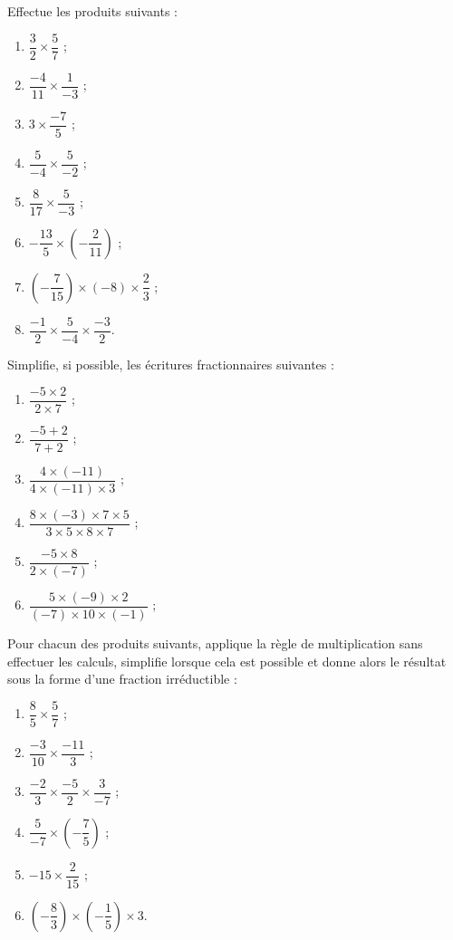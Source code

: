 \begin{exercice}
Effectue les produits suivants :
\begin{enumerate}
\item $\dfrac{3}{2} \times \dfrac{5}{7}$ ;
\item $\dfrac{-4}{11} \times \dfrac{1}{-3}$ ;
\item $3 \times \dfrac{-7}{5}$ ;
\item $\dfrac{5}{-4} \times \dfrac{5}{-2}$ ;
\item $\dfrac{8}{17} \times \dfrac{5}{-3}$ ;
\item $-\dfrac{13}{5} \times \left(-\dfrac{2}{11}\right)$ ;
\item $\left(-\dfrac{7}{15}\right) \times (-8) \times \dfrac{2}{3}$ ;
\item $\dfrac{-1}{2} \times \dfrac{5}{-4} \times \dfrac{-3}{2}$.
\end{enumerate}
\end{exercice}




\newpage
\begin{exercice}
Simplifie, si possible, les écritures fractionnaires suivantes :
\begin{enumerate}
\item $\dfrac{-5 \times 2}{2 \times 7}$ ;  
\item $\dfrac{-5 + 2}{7 + 2}$ ;
\item $\dfrac{4 \times (-11)}{4 \times (-11) \times 3}$ ;
\item $\dfrac{8 \times (-3) \times 7 \times 5}{3 \times 5 \times 8 \times 7}$ ;
\item $\dfrac{-5 \times 8}{2 \times (-7)}$ ;
\item $\dfrac{5 \times (-9) \times 2}{(-7) \times 10 \times (-1)}$ ;
\end{enumerate}
\end{exercice}





\begin{exercice}
Pour chacun des produits suivants, applique la règle de multiplication sans effectuer les calculs, simplifie lorsque cela est possible et donne alors le résultat sous la forme d'une fraction irréductible :
\begin{enumerate}
\item $\dfrac{8}{5} \times \dfrac{5}{7}$ ;
\item $\dfrac{-3}{10} \times \dfrac{-11}{3}$ ;
\item $\dfrac{-2}{3} \times \dfrac{-5}{2} \times \dfrac{3}{-7}$ ;
\item $\dfrac{5}{-7} \times \left(-\dfrac{7}{5}\right)$ ;
\item $-15 \times \dfrac{2}{15}$ ;
\item $\left(-\dfrac{8}{3}\right) \times \left(-\dfrac{1}{5}\right) \times 3$.
\end{enumerate}
\end{exercice}




